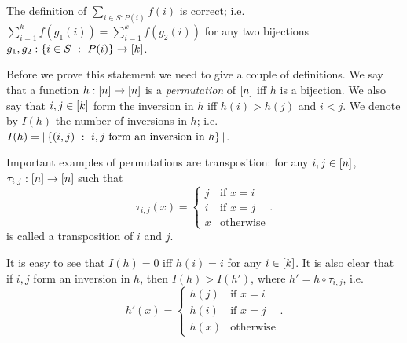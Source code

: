 \begin{theorem}
\label{theorem:sum-correctness}
    The definition of $\sum_{i \in S : P(i)} f(i)$ is correct;
    i.e. $\sum_{i = 1}^k f(g_1(i)) = \sum_{i = 1}^k f(g_2(i))$
    for any two bijections $g_1, g_2 : \set[P(i)]{i \in S} \to \range{k}$.
\end{theorem}
Before we prove this statement we need to give a couple of definitions.
We say that a function $h : {[{n}]} \to {[{n}]}$ is a \emph{permutation} of
${[{n}]}$ iff $h$ is a bijection. We also say that
$i, j \in {[{k}]}$ form the inversion in $h$ iff $h(i) > h(j)$ and $i < j$.
We denote by $I(h)$ the number of inversions in $h$; i.e. $I(h) =
|\set[i, j \text{ form an inversion in } h]{(i, j)}|$.

Important examples of permutations are transposition: for any
$i, j \in {[{n}]}$, $\tau_{i, j} : {[{n}]} \to {[{n}]}$ such that
\[
    \tau_{i, j}(x) =
    \begin{cases}
        j & \text{if } x = i \\
        i & \text{if } x = j \\
        x & \text{otherwise}
    \end{cases}.
\]
is called a transposition of $i$ and $j$.

It is easy to see that $I(h) = 0$ iff $h(i) = i$ for any $i \in {[{k}]}$.
It is also clear that if $i, j$ form an inversion in $h$, then $I(h) > I(h')$,
where $h' = h \circ \tau_{i, j}$, i.e.
\[
    h'(x) =
    \begin{cases}
        h(j) & \text{if } x = i \\
        h(i) & \text{if } x = j \\
        h(x) & \text{otherwise}
    \end{cases}.
\]


